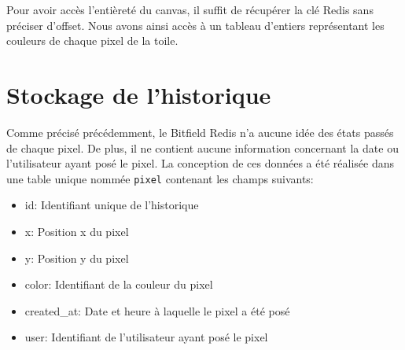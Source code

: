 Pour avoir accès l'entièreté du canvas, il suffit de récupérer la clé Redis sans préciser d'offset. Nous avons ainsi accès à un tableau d'entiers représentant les couleurs de chaque pixel de la toile.

\section{Stockage de l'historique}

Comme précisé précédemment, le Bitfield Redis n'a aucune idée des états passés de chaque pixel. De plus, il ne contient aucune information concernant la date ou l'utilisateur ayant posé le pixel. La conception de ces données a été réalisée dans une table unique nommée \texttt{pixel} contenant les champs suivants:

\begin{itemize}
  \item id: Identifiant unique de l'historique
  \item x: Position x du pixel
  \item y: Position y du pixel
  \item color: Identifiant de la couleur du pixel
  \item created\_at: Date et heure à laquelle le pixel a été posé
  \item user: Identifiant de l'utilisateur ayant posé le pixel
\end{itemize}


